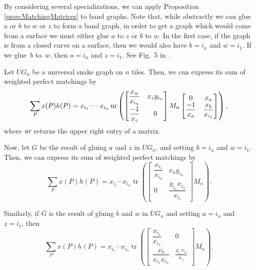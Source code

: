 By considering several specializations, we can apply Proposition \ref{prop:MatchingMatrices} to band graphs. Note that, while abstractly we can glue $a$ or $b$ to $w$ or $z$ to form a band graph, in order to get a graph which would come from a surface we must either glue $a$ to $z$ or $b$ to $w$. In the first case, if the graph is from a closed curve on a surface, then we would also have $b = i_n$ and $w = i_1$. If we glue~$b$ to~$w$, then $a = i_n$ and $z = i_1$. See Fig.~5 in~\cite{MW}.

\begin{Theorem}\label{thm:upperright}
Let $UG_n$ be a universal snake graph on $n$ tiles. Then, we can express its sum of weighted perfect matchings by{\samepage \[
\sum_P x(P) h(P) = x_{i_1} \cdots x_{i_n} \operatorname{ur} \left( \begin{bmatrix} \dfrac{x_w}{x_{i_n}} & x_z y_{i_n} \vspace{1mm}\\ \dfrac{-1}{x_z} & 0 \end{bmatrix} M_n \begin{bmatrix} 0 & x_a \\ \dfrac{-1}{x_a} & \dfrac{x_b}{x_{i_1}} \end{bmatrix}\right),
\]
where $\emph{ur}$ returns the upper right entry of a matrix.}

Now, let $G$ be the result of gluing $a$ and $z$ in $UG_n$, and setting $b = i_n$ and $w = i_1$. Then, we can express its sum of weighted perfect matchings by\[
\sum_P x(P) h(P) = x_{i_1} \cdots x_{i_n} \operatorname{tr} \left( \begin{bmatrix} \dfrac{x_{i_1}}{x_{i_n}} & x_a y_{i_n} \\ 0 & \dfrac{y_{i_n} x_{i_n}}{x_{i_1}} \end{bmatrix} M_n \right).
\]

Similarly, if $G$ is the result of gluing $b$ and $w$ in $UG_n$ and setting $a = i_n$ and $z = i_1$, then
\[
\sum_P x(P) h(P) = x_{i_1} \cdots x_{i_n} \operatorname{tr} \left( \begin{bmatrix} \dfrac{x_{i_1}}{x_{i_n}} & 0 \\ \dfrac{x_b}{x_{i_1}x_{i_n}} & \frac{y_{i_n} x_{i_n}}{x_{i_1}} \end{bmatrix} M_n \right).
\]
\end{Theorem}

